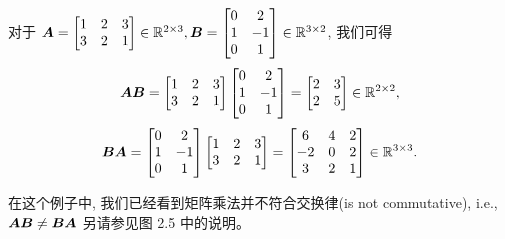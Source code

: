 \begin{example}
    对于
    $
    \boldsymbol{A} =
    \begin{bmatrix}
        1 & 2 & 3 \\
        3 & 2 & 1
    \end{bmatrix}
    \in \mathbb{R}^{2 \times 3},
    \boldsymbol{B} =
    \begin{bmatrix}
        0 & 2 \\
        1 & -1 \\
        0 & 1
    \end{bmatrix}
    \in \mathbb{R}^{3 \times 2}
    $,
    我们可得
    \begin{equation}
        \boldsymbol{A}\boldsymbol{B} =
        \begin{bmatrix}
            1 & 2 & 3 \\
            3 & 2 & 1
        \end{bmatrix}
        \begin{bmatrix}
            0 & 2 \\
            1 & -1 \\
            0 & 1 \\
        \end{bmatrix}
        =
        \begin{bmatrix}
            2 & 3 \\
            2 & 5
        \end{bmatrix}
        \in \mathbb{R}^{2 \times 2},
    \end{equation}
    \begin{equation}
        \boldsymbol{B}\boldsymbol{A} =
        \begin{bmatrix}
            0 & 2 \\
            1 & -1 \\
            0 & 1
        \end{bmatrix}
        \begin{bmatrix}
            1 & 2 & 3 \\
            3 & 2 & 1
        \end{bmatrix}
        =
        \begin{bmatrix}
            6 & 4 & 2 \\
            -2 & 0 & 2 \\
            3 & 2 & 1
        \end{bmatrix}
        \in \mathbb{R}^{3 \times 3}.
    \end{equation}
\end{example}

在这个例子中, 我们已经看到矩阵乘法并不符合交换律(is not commutative), i.e.,
$\boldsymbol{A}\boldsymbol{B} \neq \boldsymbol{B}\boldsymbol{A}$
另请参见图 2.5 中的说明。

